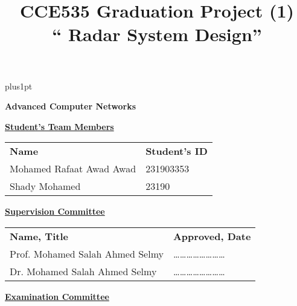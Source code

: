 \documentclass[oneside,12pt]{Latex/Classes/Thesis_Class_File}
\title{\textbf{\LARGE CCE535 Graduation Project (1)\\ \vspace{10mm} `` Radar System Design''}}
\begin{document}
\renewcommand\baselinestretch{1.2}
\baselineskip=18pt plus1pt


\maketitle 


\newpage\null\thispagestyle{empty}\newpage
\thispagestyle{empty}

\begin{center}
{\setlength{\baselineskip}{1.5\baselineskip}
\textbf{\LARGE Advanced Computer Networks }
\par}
\end{center}
\vspace*{5mm}
\begin{center}
	\textbf{\underline{Student's Team Members}}
\end{center}
\begin{tabular}{p{10cm} p{5cm}}  
\textbf{Name}  & \textbf{Student's ID} \\
Mohamed Rafaat Awad Awad & 231903353 \\
Shady Mohamed & 23190

\end{tabular}
\vspace*{3mm}
\begin{center}
	\textbf{\underline{Supervision Committee}}
\end{center}
\vspace*{3mm}
\begin{tabular}{p{12cm}  p{5cm}}
\textbf{Name, Title} & \textbf{Approved, Date} \\
Prof. Mohamed Salah Ahmed Selmy  & \ldots\ldots\ldots\ldots\ldots\ldots\ldots\ldots \\
Dr.  Mohamed Salah Ahmed Selmy  &\ldots\ldots\ldots\ldots\ldots\ldots\ldots\ldots \\
\end{tabular}
\vspace*{3mm}
\begin{center}
	\textbf{\underline{Examination Committee}}
\end{center}
\vspace*{3mm}
\end{document}
